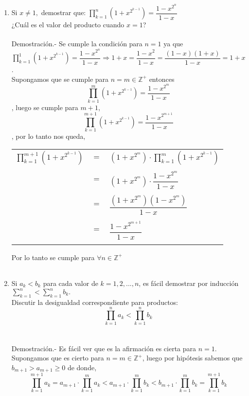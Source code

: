 \begin{enumerate}
\item Si $x\neq 1,$ demostrar que: $\displaystyle\prod_{k=1}^n (1 + x^{2^{k-1}}) = \dfrac{1 - x^{2^n}}{1-x}$\\
¿Cuál es el valor del producto cuando $x=1$?\\\\
Demostración.- \; Se cumple la condición para $n=1$ ya que $\prod\limits_{k=1}^1 (1 + x^{2^{k-1}}) = \dfrac{1 - x^{2^{n}}}{1-x} \Rightarrow 1 + x = \dfrac{1 - x^2}{1-x} = \dfrac{(1-x)(1+x)}{1-x} = 1+x$.\\
Supongamos que se cumple para $n= m \in \mathbb{Z}^+$ entonces $$\prod\limits_{k=1}^m (1 + x^{2^{k-1}}) = \dfrac{1 - x^{2^m}}{1-x}$$, luego se cumple para $m+1$, $$\prod\limits_{k=1}^{m+1} (1 + x^{2^{k-1}}) = \dfrac{1 - x^{2^{m+1}}}{1-x}$$, por lo tanto nos queda,\\
\begin{center}
\begin{tabular}{rcl}
$\prod\limits_{k=1}^{m+1} (1 + x^{2^{k-1}})$&$=$&$(1 + x^{2^{m}})\cdot \prod\limits_{k=1}^{m} (1 + x^{2^{k-1}})$\\\\
&$=$&$(1 + x^{2^{m}})\cdot \dfrac{1 - x^{2^m}}{1-x}$\\\\
&$=$&$\dfrac{(1+x^{2^m})(1-x^{2^m})}{1-x}$\\\\
&$=$&$\dfrac{1 - x^{2^{m+1}}}{1-x}$\\\\
\end{tabular}
\end{center}
Por lo tanto se cumple para $\forall n \in \mathbb{Z}^+$\\\\

\item Si $a_k < b_k$ para cada valor de $k=1,2,...,n$, es fácil demostrar por inducción $\displaystyle\sum_{k=1}^n < \sum_{k=1}^n b_k.$\\
Discutir la desigualdad correspondiente para productos:
$$\displaystyle\prod_{k=1}^n a_k < \prod_{k=1}^n b_k$$\\\\
Demostración.- \; Es fácil ver que es la afirmación es cierta para $n=1$. Supongamos que es cierto para $n=m \in \mathbb{Z}^+$, luego por hipótesis sabemos que $b_{m+1}>a_{m+1} \geq 0$ de donde, $$\prod\limits_{k=1}^{m+1} a_k = a_{m+1} \cdot \prod\limits_{k=1}^m a_k < a_{m+1} \cdot \prod\limits_{k=1}^m b_k<b_{m+1} \cdot \prod\limits_{k=1}^m b_k = \prod\limits_{k=1}^{m+1} b_k$$\\\\


\end{enumerate}
